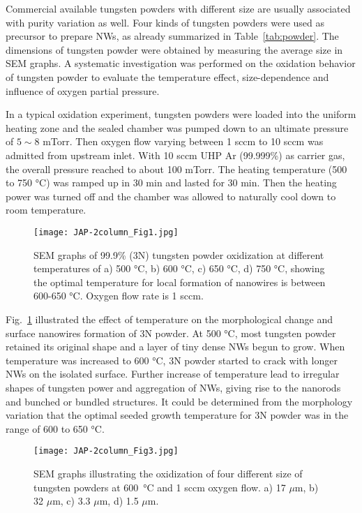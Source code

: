 Commercial available tungsten powders with different size are usually associated with purity variation as well. Four kinds of tungsten powders were used as precursor to prepare  NWs, as already summarized in Table~\ref{tab:powder}. The dimensions of tungsten powder were obtained by measuring the average size in SEM graphs. A systematic investigation was performed on the oxidation behavior of tungsten powder to evaluate the temperature effect, size-dependence and influence of oxygen partial pressure.

In a typical oxidation experiment, tungsten powders were loaded into the uniform heating zone and the sealed chamber was pumped down to an ultimate pressure of $5\sim8$ mTorr. Then oxygen flow varying between 1 sccm to 10 sccm was admitted from upstream inlet. With 10 sccm UHP Ar (99.999\%) as carrier gas, the overall pressure reached to about 100 mTorr. The heating temperature (500 to 750 \si{\degreeCelsius}) was ramped up in 30 min and lasted for 30 min. Then the heating power was turned off and the chamber was allowed to naturally cool down to room temperature.

\begin{figure}[htb]
\centering
\texttt{[image: JAP-2column\_Fig1.jpg]}
\caption[W powder oxidation: temperature effect]{SEM graphs of 99.9\% (3N) tungsten powder oxidization at different temperatures of a) 500 \si{\degreeCelsius}, b) 600 \si{\degreeCelsius}, c) 650 \si{\degreeCelsius}, d) 750 \si{\degreeCelsius}, showing the optimal temperature for local formation of nanowires is between 600-650 \si{\degreeCelsius}. Oxygen flow rate is 1 sccm.}
\label{fig:pdtemp}
\end{figure}

Fig.~\ref{fig:pdtemp} illustrated the effect of temperature on the morphological change and surface nanowires formation of 3N powder. At 500 \si{\degreeCelsius}, most tungsten powder retained its original shape and a layer of tiny dense NWs begun to grow. When temperature was increased to 600 \si{\degreeCelsius}, 3N powder started to crack with longer NWs on the isolated surface. Further increase of temperature lead to irregular shapes of tungsten power and aggregation of NWs, giving rise to the nanorods and bunched or bundled structures. It could be determined from the morphology variation that the optimal seeded growth temperature for 3N powder was in the range of 600 to 650 \si{\degreeCelsius}.
\begin{figure}[htb]
\centering
\texttt{[image: JAP-2column\_Fig3.jpg]}
\caption[W powder oxidation: size effect]{SEM graphs illustrating the oxidization of four different size of tungsten powders at 600~\si{\degreeCelsius} and 1 sccm oxygen flow. a) 17 $\mu$m, b) 32 $\mu$m, c) 3.3 $\mu$m, d) 1.5 $\mu$m.}
\label{fig:pdsize}
\end{figure}

